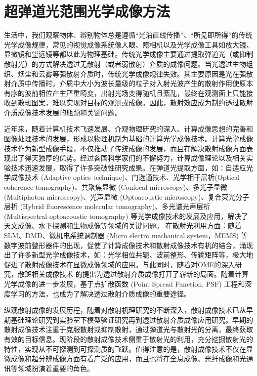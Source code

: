 
\chapter{超弹道光范围光学成像方法}\label{chap:2}
生活中，我们观察物体、辨别物体总是遵循“光沿直线传播”、“所见即所得”的传统光学成像规律，常见的视觉成像系统像人眼、照相机以及光学成像工具如放大镜、显微镜和望远镜等都以此为物理基础。传统光学成像主要通过提取弹道光（或抑制散射光）的方式解决透过无散射（或者弱散射）介质的成像问题。当光透过生物组织、烟尘和云雾等强散射介质时，传统光学成像规律失效。其主要原因是光在强散射介质中传播时，介质中大小为波长量级的粒子对入射光波产生的散射作用使原本有序的波前相位产生严重畸变，出射光场变得随机且紊乱，最终在观测面上只能接收到散斑图案，难以实现对目标的观测或成像。因此，散射效应成为制约透过散射介质成像技术发展的瓶颈和关键问题。

近年来，随着计算机技术飞速发展、介观物理研究的深入、计算成像思想的完善和图像处理技术的发展，形成以物理机制为基础的计算光学成像技术。计算光学成像技术作为新型成像手段，不仅推动了传统成像的发展，而且在解决散射成像方面表现出了得天独厚的优势。经过各国科学家们的不懈努力，计算成像理论以及相关实验技术迅速发展，取得了许多突破性研究成果。在弹道光提取方面，如：自适应光学成像技术 (Adaptive optics technique)、门选通技术、光学相干层析(Optical coherence tomography)\cite{huang_optical_1991}、共聚焦显微 (Confocal microscopy)\cite{webb_confocal_1996}、多光子显微 (Multiphoton microscopy)\cite{denk_two_photon_1990,helmchen_deep_2005}、光声显微 (Optoacoustic microscopy)\cite{zhang_functional_2006,wang_multiscale_2009}、复合荧光分子层析 (Hybrid fluorescence molecular tomography)\cite{ale_fmt_xct_2012}、多光谱光声层析 (Multispectral optoacoustic tomography)\cite{razansky_volumetric_2011,ntziachristos_going_2010} 等光学成像技术的发展及应用，解决了天文成像、水下探测和生物成像等领域的关键问题。
在散射光利用方面：随着SLM、DMD、微机电系统调制器 (Micro electro mechanical system，MEMS) 等数字波前整形器件的出现，促使了计算成像技术和散射成像技术有机的结合，涌现出了许多新型光学成像技术，如：光学相位共轭\cite{yaqoob_optical_2008}、波前整形\cite{Vellekoop2007,vellekoop_exploiting_2010,conkey_genetic_2012,blochet_fast_2017}、传输矩阵\cite{Popoff2010}等，极大地促进了散射成像技术在显微成像领域的应用。与此同时，随着对OME\cite{Freund1988}的深入研究，散斑相关成像技术 的提出为透过散射介质成像打开了崭新的局面。随着计算光学成像的进一步发展，基于点扩散函数 (Point Spread Function, PSF) 工程\cite{sahoo_single-shot_2017}和深度学习\cite{li_deep_2018}的方法，也成为了解决透过散射介质成像的重要途径。

纵观散射成像的发展历程，随着对散射机理研究的不断深入，散射成像技术已从早期基础理论研究到实验室下模型验证研究再到透过散射介质成像应用研究。早期的散射成像技术注重于克服散射或抑制散射，通过弹道光与散射光的分离，最终获取有效的目标信息。现阶段的散射成像技术侧重于散射光的利用，充分挖掘散射光的特性，实现从不可探测到可探测质的飞跃。值得注意的是，散射成像技术不仅在显微成像和超分辨成像方面有着广泛的应用，而且也将在全息成像、光纤成像和光通讯等领域扮演着重要的角色。

